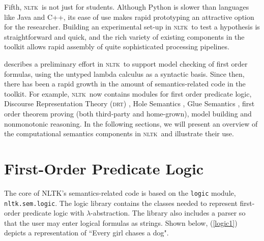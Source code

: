 \documentclass[11pt]{article}
\newcommand{\DRT}{\textsc{drt}}
\newcommand{\NLTK}{\textsc{nltk}}
\newcommand{\dhgcode}[1]{{\tt #1}}
\begin{document}
Fifth, \NLTK\ is not just for students. Although Python is slower than
languages like Java and C++, its ease of use makes rapid prototyping
an attractive option for the researcher. Building an experimental
set-up in \NLTK\ to test a hypothesis is straightforward and quick,
and the rich variety of existing components in the toolkit allows
rapid assembly of quite sophisticated processing pipelines.

\citet{Klein06altw} describes a preliminary effort in \NLTK\ to
support model checking of first order formulas, using the untyped
lambda calculus as a syntactic basis. Since then, there has been a
rapid growth 
in the amount of semantics-related code in the toolkit.  For example,
\NLTK\ now contains modules for first order predicate logic, Discourse
Representation Theory (\DRT) \cite{KampReyle}, Hole Semantics
\cite{BB}, Glue Semantics \cite{Dalrymple2001}, first order theorem proving (both
third-party and home-grown), model building and nonmonotonic
reasoning. 
In the following sections, we will present an overview of the
computational semantics components in \NLTK\ and illustrate their use.



\section{First-Order Predicate Logic}
The core of NLTK's semantics-related code is based on the \dhgcode{logic} module, \dhgcode{nltk.sem.logic}.  The logic library contains the classes needed to represent first-order predicate logic with $\lambda$-abstraction.  The library also includes a parser so that the user may enter logical formulas as strings.  Shown below, (\ref{logic1}) depicts a representation of ``Every girl chases a dog".  
\end{document}
